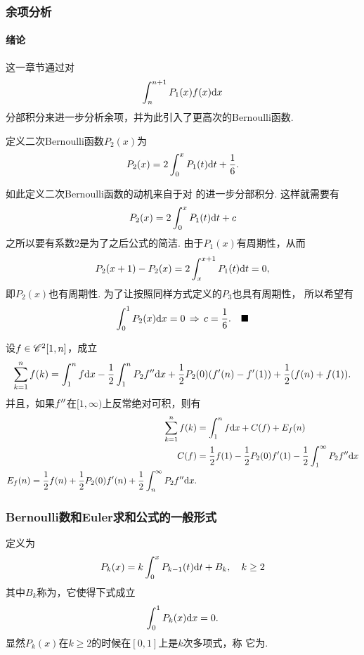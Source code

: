   \subsubsection{余项分析}
    \paragraph{绪论}
      这一章节通过对
      \begin{equation}
        \label{equ: Euler求和公式余项1}
        \int_n^{n+1}P_1(x)\mathnormal{f}(x)\mathrm{d} x
      \end{equation}
      分部积分来进一步分析余项，并为此引入了更高次的Bernoulli函数.

    \begin{defi}[二次Bernoulli函数]
      定义二次Bernoulli函数$P_2(x)$为
      \[
        P_2(x) = 2\int_0^xP_1(t)\mathrm{d} t + \frac{1}{6}.
      \]
    \end{defi}
    \remark
      如此定义二次Bernoulli函数的动机来自于对
      的进一步分部积分. 这样就需要有
      \[
        P_2(x) = 2\int_0^xP_1(t)\mathrm{d} t + c
      \]
      之所以要有系数$2$是为了之后公式的简洁. 由于$P_1(x)$有周期性，从而
      \[
        P_2(x+1) - P_2(x) = 2\int_x^{x+1}P_1(t)\mathrm{d} t = 0,
      \]
      即$P_2(x)$也有周期性. 为了让按照同样方式定义的$P_3$也具有周期性，
      所以希望有
      \[
        \int_0^1P_2(x)\mathrm{d} x= 0 \,\Rightarrow\, c = \frac{1}{6}.
        \quad\blacksquare
      \]

    \begin{thm}[二次导数形式的Euler求和公式]
      设$\mathnormal{f}\in\mathscr{C}^2[1, n]$，成立
      \[
        \sum_{k=1}^n\mathnormal{f}(k) = \int_1^n\mathnormal{f}\mathrm{d} x
        - \frac{1}{2}\int_1^nP_2\mathnormal{f}^{\prime\prime}\mathrm{d} x
        + \frac{1}{2}P_2(0)(\mathnormal{f}^\prime(n)-\mathnormal{f}^\prime(1))
        + \frac{1}{2}(\mathnormal{f}(n) + \mathnormal{f}(1)).
      \]
      并且，如果$\mathnormal{f}^{\prime\prime}$在$[1, \infty)$上反常绝对可积，则有
      \[\begin{split}
        \sum_{k=1}^n\mathnormal{f}(k) &= \int_1^n\mathnormal{f}\mathrm{d} x + C(\mathnormal{f}) + E_{\mathnormal{f}}(n) \\
        C(\mathnormal{f}) &= \frac{1}{2}\mathnormal{f}(1) - \frac{1}{2}P_2(0)\mathnormal{f}^\prime(1)
        - \frac{1}{2}\int_1^\infty P_2\mathnormal{f}^{\prime\prime}\mathrm{d} x \\
        E_{\mathnormal{f}}(n) = \frac{1}{2}\mathnormal{f}(n) + \frac{1}{2}P_2(0)\mathnormal{f}^\prime(n) +
        \frac{1}{2}\int_n^\infty P_2\mathnormal{f}^{\prime\prime}\mathrm{d} x.
      \end{split}\]
    \end{thm}

  \subsubsection{Bernoulli数和Euler求和公式的一般形式}
    \begin{defi}
      定义为
      \begin{equation}
          P_k(x) = k\int_0^x P_{k-1}(t)\mathrm{d} t + B_k,\quad k\ge 2
      \end{equation}
      其中$B_k$称为，它使得下式成立
      \[
        \int_0^1P_k(x)\mathrm{d} x = 0.
      \]
      显然$P_k(x)$在$k\ge 2$的时候在$[0, 1]$上是$k$次多项式，称
      它为.
    \end{defi}

